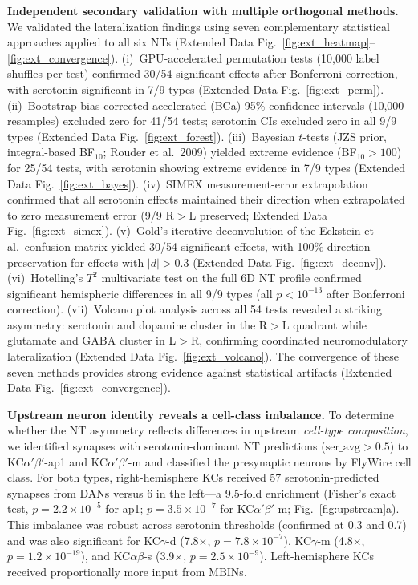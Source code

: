 \documentclass[10pt]{article}
\begin{document}
\textbf{Independent secondary validation with multiple orthogonal methods.} We validated the lateralization findings using seven complementary statistical approaches applied to all six NTs (Extended Data Fig.~\ref{fig:ext_heatmap}--\ref{fig:ext_convergence}). (i)~GPU-accelerated permutation tests (10,000 label shuffles per test) confirmed 30/54 significant effects after Bonferroni correction, with serotonin significant in 7/9 types (Extended Data Fig.~\ref{fig:ext_perm}). (ii)~Bootstrap bias-corrected accelerated (BCa) 95\% confidence intervals (10,000 resamples) excluded zero for 41/54 tests; serotonin CIs excluded zero in all 9/9 types (Extended Data Fig.~\ref{fig:ext_forest}). (iii)~Bayesian $t$-tests (JZS prior, integral-based BF$_{10}$; Rouder et al.\ 2009) yielded extreme evidence (BF$_{10} > 100$) for 25/54 tests, with serotonin showing extreme evidence in 7/9 types (Extended Data Fig.~\ref{fig:ext_bayes}). (iv)~SIMEX measurement-error extrapolation confirmed that all serotonin effects maintained their direction when extrapolated to zero measurement error (9/9 R$>$L preserved; Extended Data Fig.~\ref{fig:ext_simex}). (v)~Gold's iterative deconvolution of the Eckstein et al.\ confusion matrix yielded 30/54 significant effects, with 100\% direction preservation for effects with $|d| > 0.3$ (Extended Data Fig.~\ref{fig:ext_deconv}). (vi)~Hotelling's $T^2$ multivariate test on the full 6D NT profile confirmed significant hemispheric differences in all 9/9 types (all $p < 10^{-13}$ after Bonferroni correction). (vii)~Volcano plot analysis across all 54 tests revealed a striking asymmetry: serotonin and dopamine cluster in the R$>$L quadrant while glutamate and GABA cluster in L$>$R, confirming coordinated neuromodulatory lateralization (Extended Data Fig.~\ref{fig:ext_volcano}). The convergence of these seven methods provides strong evidence against statistical artifacts (Extended Data Fig.~\ref{fig:ext_convergence}).

\textbf{Upstream neuron identity reveals a cell-class imbalance.} To determine whether the NT asymmetry reflects differences in upstream \textit{cell-type composition}, we identified synapses with serotonin-dominant NT predictions ($\mathrm{ser\_avg} > 0.5$) to KC$\alpha'\beta'$-ap1 and KC$\alpha'\beta'$-m and classified the presynaptic neurons by FlyWire cell class. For both types, right-hemisphere KCs received 57 serotonin-predicted synapses from DANs versus 6 in the left---a 9.5-fold enrichment (Fisher's exact test, $p = 2.2 \times 10^{-5}$ for ap1; $p = 3.5 \times 10^{-7}$ for KC$\alpha'\beta'$-m; Fig.~\ref{fig:upstream}a). This imbalance was robust across serotonin thresholds (confirmed at 0.3 and 0.7) and was also significant for KC$\gamma$-d (7.8$\times$, $p = 7.8 \times 10^{-7}$), KC$\gamma$-m (4.8$\times$, $p = 1.2 \times 10^{-19}$), and KC$\alpha\beta$-s (3.9$\times$, $p = 2.5 \times 10^{-9}$). Left-hemisphere KCs received proportionally more input from MBINs.
\end{document}
